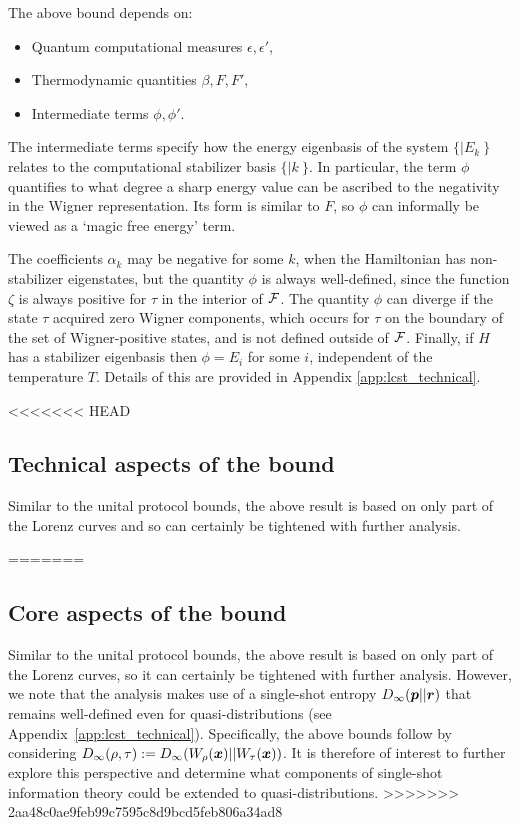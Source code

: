 \documentclass[pra,
aps,
twocolumn,
superscriptaddress,
groupedaddress,
nofootinbib,
reprint
]{revtex4-1}
\begin{document}
The above bound depends on: 
\begin{itemize}
\item Quantum computational measures $\epsilon, \epsilon'$,
\item Thermodynamic quantities $\beta, F, F',$
\item Intermediate terms $\phi, \phi'$. 
\end{itemize}
The intermediate terms specify how the energy eigenbasis of the system $\{|E_k\>\}$ relates to the computational stabilizer basis $\{|k\>\}$.  In particular, the term $\phi$ quantifies to what degree a sharp energy value can be ascribed to the negativity in the Wigner representation. Its form is similar to $F$, so $\phi$ can informally be viewed as a `magic free energy' term. 

The coefficients $\alpha_k$ may be negative for some $k$, when the Hamiltonian has non-stabilizer eigenstates, but the quantity $\phi$ is always well-defined, since the function $\zeta$ is always positive for $\tau$ in the interior of ${\mathcal F}$. The quantity $\phi$ can diverge if the state $\tau$ acquired zero Wigner components, which occurs for $\tau$ on the boundary of the set of Wigner-positive states, and is not defined outside of ${\mathcal F}$. Finally, if $H$ has a stabilizer eigenbasis then $\phi = E_i$ for some $i$, independent of the temperature $T$. Details of this are provided in Appendix \ref{app:lcst_technical}.

<<<<<<< HEAD
\subsection{Technical aspects of the bound}
Similar to the unital protocol bounds, the above result is based on only part of the Lorenz curves and so can certainly be tightened with further analysis. 

=======
\subsection{Core aspects of the bound}
Similar to the unital protocol bounds, the above result is based on only part of the Lorenz curves, so it can certainly be tightened with further analysis. However, we note that the analysis makes use of a single-shot entropy $D_\infty (\boldsymbol{p} ||\boldsymbol{r})$ that remains well-defined even for quasi-distributions (see Appendix~\ref{app:lcst_technical}). Specifically, the above bounds follow by considering $D_\infty(\rho, \tau) := D_\infty (W_\rho(\boldsymbol{x}) || W_\tau (\boldsymbol{x}))$. It is therefore of interest to further explore this perspective and determine what components of single-shot information theory could be extended to quasi-distributions.
>>>>>>> 2aa48c0ae9feb99c7595c8d9bcd5feb806a34ad8
\end{document}
